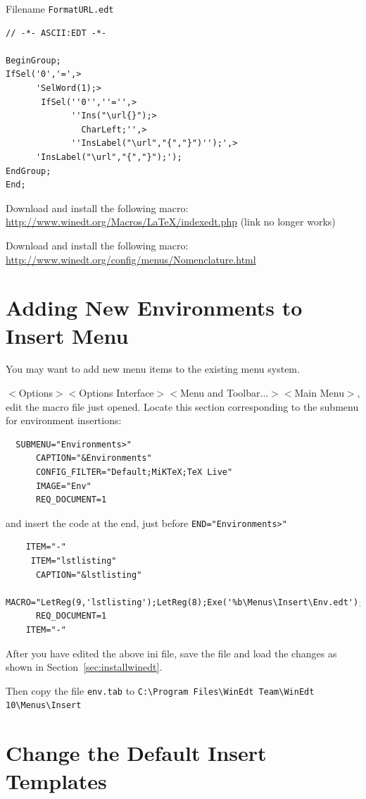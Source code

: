 Filename \texttt{FormatURL.edt}
\begin{lstlisting}
// -*- ASCII:EDT -*-

BeginGroup;
IfSel('0','=',>
      'SelWord(1);>
       IfSel(''0'',''='',>
             ''Ins("\url{}");>
               CharLeft;'',>
             ''InsLabel("\url","{","}")'');',>
      'InsLabel("\url","{","}");');
EndGroup;
End;
\end{lstlisting}


Download and install the following macro:\\
\url{http://www.winedt.org/Macros/LaTeX/indexedt.php} (link no longer works)

Download and install the following macro:\\
\url{http://www.winedt.org/config/menus/Nomenclature.html}

\section{Adding New Environments to Insert Menu}

You may want to add new menu items to the existing menu system.

$<$Options$>$$<$Options Interface$>$$<$Menu and Toolbar...$>$$<$Main Menu$>$, edit the macro file just opened. Locate this section corresponding to the submenu for environment insertions:

\begin{lstlisting}
  SUBMENU="Environments>"
      CAPTION="&Environments"
      CONFIG_FILTER="Default;MiKTeX;TeX Live"
      IMAGE="Env"
      REQ_DOCUMENT=1
\end{lstlisting}

and insert the code at the end, just before   \verb+END="Environments>"+

\begin{lstlisting}
    ITEM="-"
     ITEM="lstlisting"
      CAPTION="&lstlisting"
      MACRO="LetReg(9,'lstlisting');LetReg(8);Exe('%b\Menus\Insert\Env.edt');"
      REQ_DOCUMENT=1
    ITEM="-"
\end{lstlisting}

After you have edited the above ini file, save the file and load the changes as shown in Section~\ref{sec:installwinedt}.

Then copy the file \verb+env.tab+ to 
\verb+C:\Program Files\WinEdt Team\WinEdt 10\Menus\Insert+

\section{Change the Default Insert Templates}

